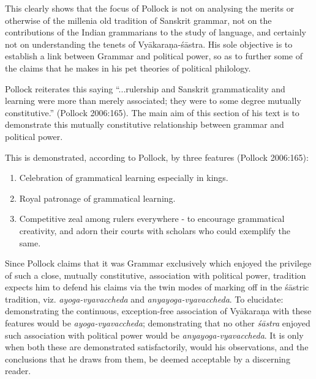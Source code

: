 This clearly shows that the focus of Pollock is not on analysing the merits or otherwise of the millenia old tradition of Sanskrit grammar, not on the contributions of the Indian grammarians to the study of language, and certainly not on understanding the tenets of Vyākaraṇa-śāstra. His sole objective is to establish a link between Grammar and political power, so as to further some of the claims that he makes in his pet theories of political philology.

Pollock reiterates this saying ``...rulership and Sanskrit grammaticality and learning were more than merely associated; they were to some degree mutually constitutive.'' (Pollock 2006:165). The main aim of this section of his text is to demonstrate this mutually constitutive relationship between grammar and political power.

This is demonstrated, according to Pollock, by three features (Pollock 2006:165):
\begin{enumerate}
\item Celebration of grammatical learning especially in kings.
\item Royal patronage of grammatical learning.
\item Competitive zeal among rulers everywhere - to encourage grammatical creativity, and adorn their courts with scholars who could exemplify the same. 
\end{enumerate}

Since Pollock claims that it was Grammar exclusively which enjoyed the privilege of such a close, mutually constitutive, association with political power, tradition expects him to defend his claims via the twin modes of marking off in the śāstric tradition, viz. {\sl ayoga-vyavaccheda} and {\sl anyayoga-vyavaccheda}. To elucidate: demonstrating the continuous, exception-free association of Vyākaraṇa with these features would be {\sl ayoga-vyavaccheda}; demonstrating that no other {\sl śāstra} enjoyed such association with political power would be {\sl anyayoga-vyavaccheda}. It is only when both these are demonstrated satisfactorily, would his observations, and the conclusions that he draws from them, be deemed acceptable by a discerning reader. 

